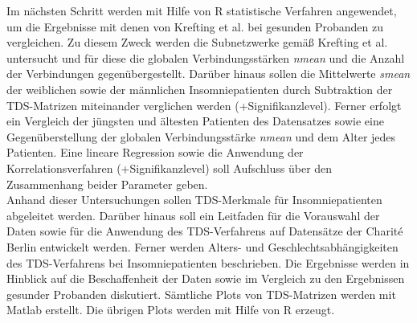 Im nächsten Schritt werden mit Hilfe von R statistische Verfahren angewendet, um die Ergebnisse mit denen von Krefting et al. bei gesunden Probanden zu vergleichen. Zu diesem Zweck werden die Subnetzwerke gemäß Krefting et al. untersucht und für diese die globalen Verbindungsstärken \textit{nmean} und die Anzahl der Verbindungen gegenübergestellt. Darüber hinaus sollen die Mittelwerte \textit{smean} der weiblichen sowie der männlichen Insomniepatienten durch Subtraktion der \acs{TDS}-Matrizen miteinander verglichen werden (+Signifikanzlevel). Ferner erfolgt ein Vergleich der jüngsten und ältesten Patienten des Datensatzes sowie eine Gegenüberstellung der globalen Verbindungsstärke \textit{nmean} und dem Alter jedes Patienten. Eine lineare Regression sowie die Anwendung der Korrelationsverfahren (+Signifikanzlevel) soll Aufschluss über den Zusammenhang beider Parameter geben.\\

Anhand dieser Untersuchungen sollen \acs{TDS}-Merkmale für Insomniepatienten abgeleitet werden. Darüber hinaus soll ein Leitfaden für die Vorauswahl der Daten sowie für die Anwendung des \acs{TDS}-Verfahrens auf Datensätze der Charit\'{e} Berlin entwickelt werden. Ferner werden Alters- und Geschlechtsabhängigkeiten des \acs{TDS}-Verfahrens bei Insomniepatienten beschrieben. Die Ergebnisse werden in Hinblick auf die Beschaffenheit der Daten sowie im Vergleich zu den Ergebnissen gesunder Probanden diskutiert. Sämtliche Plots von \acs{TDS}-Matrizen werden mit Matlab erstellt. Die übrigen Plots werden mit Hilfe von R erzeugt.


